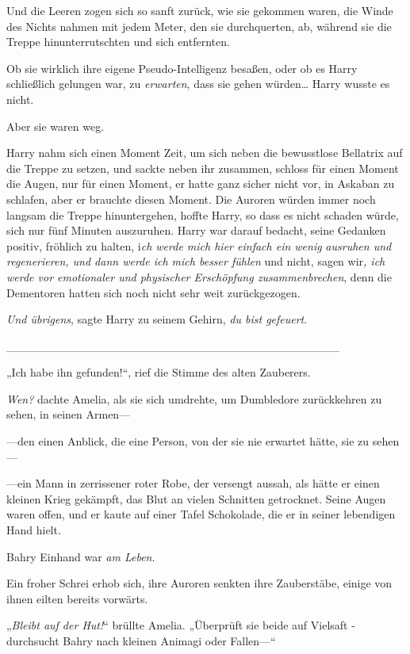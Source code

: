 {Und die Leeren zogen sich so sanft zurück, wie sie gekommen waren, die Winde des Nichts nahmen mit jedem Meter, den sie durchquerten, ab, während sie die Treppe hinunterrutschten und sich entfernten.

Ob sie wirklich ihre eigene Pseudo-Intelligenz besaßen, oder ob es Harry schließlich gelungen war, zu \emph{erwarten}, dass sie gehen würden… Harry wusste es nicht.

Aber sie waren weg.

Harry nahm sich einen Moment Zeit, um sich neben die bewusstlose Bellatrix auf die Treppe zu setzen, und sackte neben ihr zusammen, schloss für einen Moment die Augen, nur für einen Moment, er hatte ganz sicher nicht vor, in Askaban zu schlafen, aber er brauchte diesen Moment. Die Auroren würden immer noch langsam die Treppe hinuntergehen, hoffte Harry, so dass es nicht schaden würde, sich nur fünf Minuten auszuruhen. Harry war darauf bedacht, seine Gedanken positiv, fröhlich zu halten, i\emph{ch werde mich hier einfach ein wenig} \emph{ausruhen und} \emph{regenerieren, und dann werde ich mich besser fühlen} und nicht, sagen wir\emph{, ich werde vor emotionaler und physischer Erschöpfung zusammenbrechen}, denn die Dementoren hatten sich noch nicht sehr weit zurückgezogen.

\emph{Und übrigens}, sagte Harry zu seinem Gehirn, \emph{du bist gefeuert}.

\_\_\_\_\_\_\_\_\_\_\_\_\_\_\_\_\_\_\_\_\_\_\_\_\_\_\_\_\_\_\_\_\_\_\_\_\_\_\_\_

„Ich habe ihn gefunden!“, rief die Stimme des alten Zauberers.

\emph{Wen?} dachte Amelia, als sie sich umdrehte, um Dumbledore zurückkehren zu sehen, in seinen Armen—

—den einen Anblick, die eine Person, von der sie nie erwartet hätte, sie zu sehen—

—ein Mann in zerrissener roter Robe, der versengt aussah, als hätte er einen kleinen Krieg gekämpft, das Blut an vielen Schnitten getrocknet. Seine Augen waren offen, und er kaute auf einer Tafel Schokolade, die er in seiner lebendigen Hand hielt.

Bahry Einhand war \emph{am Leben}.

Ein froher Schrei erhob sich, ihre Auroren senkten ihre Zauberstäbe, einige von ihnen eilten bereits vorwärts.

„\emph{Bleibt auf der Hut!}“ brüllte Amelia. „Überprüft sie beide auf Vielsaft - durchsucht Bahry nach kleinen Animagi oder Fallen—“

}
